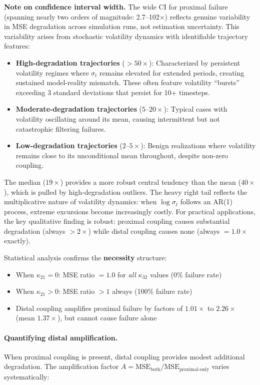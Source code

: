 \documentclass[10pt]{article} %
\theoremstyle{plain}
\theoremstyle{definition}
\begin{document}
\noindent \textbf{Note on confidence interval width.} The wide CI for proximal failure (spanning nearly two orders of magnitude: 2.7--102$\times$) reflects genuine variability in MSE degradation across simulation runs, not estimation uncertainty. This variability arises from stochastic volatility dynamics with identifiable trajectory features:

\begin{itemize}[nosep]
    \item \textbf{High-degradation trajectories} ($>50\times$): Characterized by persistent volatility regimes where $\sigma_t$ remains elevated for extended periods, creating sustained model-reality mismatch. These often feature volatility ``bursts'' exceeding 3 standard deviations that persist for 10+ timesteps.
    \item \textbf{Moderate-degradation trajectories} ($5$--$20\times$): Typical cases with volatility oscillating around its mean, causing intermittent but not catastrophic filtering failures.
    \item \textbf{Low-degradation trajectories} ($2$--$5\times$): Benign realizations where volatility remains close to its unconditional mean throughout, despite non-zero coupling.
\end{itemize}

The median ($19\times$) provides a more robust central tendency than the mean ($40\times$), which is pulled by high-degradation outliers. The heavy right tail reflects the multiplicative nature of volatility dynamics: when $\log\sigma_t$ follows an AR(1) process, extreme excursions become increasingly costly. For practical applications, the key qualitative finding is robust: proximal coupling causes substantial degradation (always $>2\times$) while distal coupling causes none (always $=1.0\times$ exactly).

\noindent Statistical analysis confirms the \textbf{necessity} structure:
\begin{itemize}
    \item When $\kappa_{21} = 0$: MSE ratio $= 1.0$ for \emph{all} $\kappa_{32}$ values (0\% failure rate)
    \item When $\kappa_{21} > 0$: MSE ratio $> 1$ always (100\% failure rate)
    \item Distal coupling amplifies proximal failure by factors of $1.01\times$ to $2.26\times$ (mean $1.37\times$), but cannot cause failure alone
\end{itemize}

\paragraph{Quantifying distal amplification.} When proximal coupling is present, distal coupling provides modest additional degradation. The amplification factor $A = \text{MSE}_{\text{both}} / \text{MSE}_{\text{proximal-only}}$ varies systematically:
\end{document}
